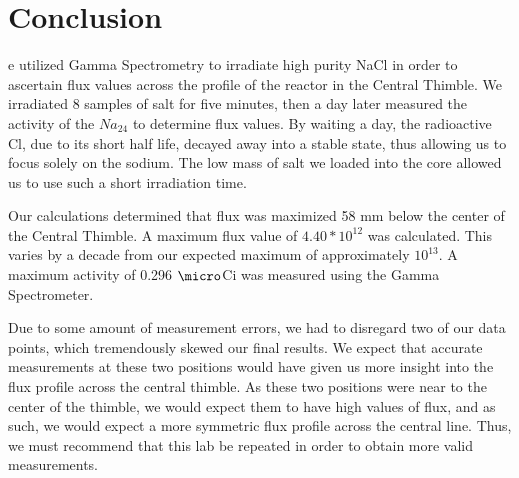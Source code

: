 %
%
\let\textcircled=\pgftextcircled
\chapter{Conclusion}
\label{chap:conclusion}

e utilized Gamma Spectrometry to irradiate high purity NaCl in order to ascertain flux values across the profile of the reactor in the Central Thimble. We irradiated 8 samples of salt for five minutes, then a day later measured the activity of the $Na_{24}$ to determine flux values. By waiting a day, the radioactive Cl, due to its short half life, decayed away into a stable state, thus allowing us to focus solely on the sodium. The low mass of salt we loaded into the core allowed us to use such a short irradiation time.

Our calculations determined that flux was maximized 58 mm below the center of the Central Thimble. A maximum flux value of $4.40 * 10^{12}$ was calculated. This varies by a decade from our expected maximum of approximately $10^{13}$. A maximum activity of 0.296 $\micro$Ci was measured using the Gamma Spectrometer. 

Due to some amount of measurement errors, we had to disregard two of our data points, which tremendously skewed our final results. We expect that accurate measurements at these two positions would have given us more insight into the flux profile across the central thimble. As these two positions were near to the center of the thimble, we would expect them to have high values of flux, and as such, we would expect a more symmetric flux profile across the central line. Thus, we must recommend that this lab be repeated in order to obtain more valid measurements.



